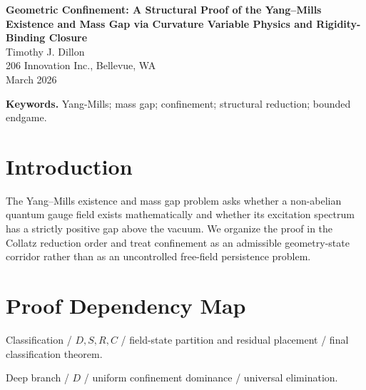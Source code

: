 \documentclass[11pt]{article}
\theoremstyle{definition}
\begin{document}
\begin{center}
{\LARGE \textbf{Geometric Confinement: A Structural Proof of the Yang--Mills Existence and Mass Gap via Curvature Variable Physics and Rigidity-Binding Closure}}\\[0.85em]
{\large Timothy J. Dillon}\\
206 Innovation Inc., Bellevue, WA\\
March 2026
\end{center}

\begin{abstract}
We study the Yang--Mills existence and mass gap problem through a structural reformulation in which gauge excitations evolve within an admissible confinement geometry governed by curvature-sensitive binding and rigidity exclusion of deconfined massless persistence. We present a reduction-and-closure proof of existence and positive mass gap based on deep-regime confinement dominance, segment-model exclusion of deconfinement templates, shallow-fragmentation control, bounded near-critical core analysis, and final incompatibility of all residual gapless candidates. The full argument reduces hypothetical gapless deconfinement behavior to deep, segment-critical, shallow-return, and near-critical families, then eliminates each family in turn. Consequently the admissible Yang--Mills system exists nontrivially and exhibits a strictly positive mass gap.
\end{abstract}

\noindent\textbf{Keywords.} Yang-Mills; mass gap; confinement; structural reduction; bounded endgame.

\section{Introduction}
The Yang--Mills existence and mass gap problem asks whether a non-abelian quantum gauge field exists mathematically and whether its excitation spectrum has a strictly positive gap above the vacuum. We organize the proof in the Collatz reduction order and treat confinement as an admissible geometry-state corridor rather than as an uncontrolled free-field persistence problem.
\section{Proof Dependency Map}
Classification / $D,S,R,C$ / field-state partition and residual placement / final classification theorem.

Deep branch / $D$ / uniform confinement dominance / universal elimination.
\end{document}
